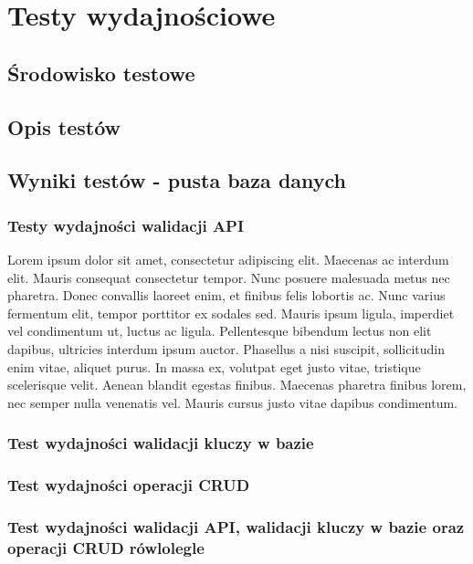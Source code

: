 \chapter{Testy wydajnościowe}
\section{Środowisko testowe}
\section{Opis testów}
\section{Wyniki testów - pusta baza danych}

\newpage
\subsection{Testy wydajności walidacji API}

\clearpage
Lorem ipsum dolor sit amet, consectetur adipiscing elit. Maecenas ac interdum elit. Mauris consequat consectetur tempor. Nunc posuere malesuada metus nec pharetra. Donec convallis laoreet enim, et finibus felis lobortis ac. Nunc varius fermentum elit, tempor porttitor ex sodales sed. Mauris ipsum ligula, imperdiet vel condimentum ut, luctus ac ligula. Pellentesque bibendum lectus non elit dapibus, ultricies interdum ipsum auctor. Phasellus a nisi suscipit, sollicitudin enim vitae, aliquet purus. In massa ex, volutpat eget justo vitae, tristique scelerisque velit. Aenean blandit egestas finibus. Maecenas pharetra finibus lorem, nec semper nulla venenatis vel. Mauris cursus justo vitae dapibus condimentum.


\newpage
\subsection{Test wydajności walidacji kluczy w bazie}
% 

\newpage
\subsection{Test wydajności operacji CRUD}
% 

\newpage
\subsection{Test wydajności walidacji API, walidacji kluczy w bazie oraz operacji CRUD rówlolegle }
% 

